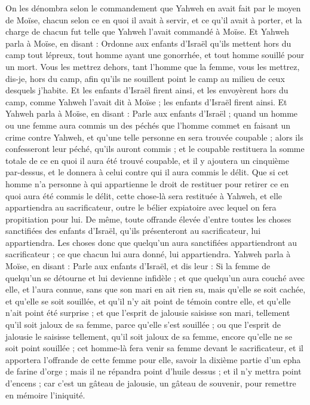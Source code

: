 \begin{multicols}{2}
On les dénombra selon le commandement que Yahweh en avait fait par le moyen de Moïse, chacun selon ce en quoi il avait à servir, et ce qu'il avait à porter, et la charge de chacun fut telle que Yahweh l'avait commandé à Moïse.
\VerseOne{}Et Yahweh parla à Moïse, en disant :
Ordonne aux enfants d'Israël qu'ils mettent hors du camp tout lépreux, tout homme ayant une gonorrhée, et tout homme souillé pour un mort.
Vous les mettrez dehors, tant l'homme que la femme, vous les mettrez, dis-je, hors du camp, afin qu'ils ne souillent point le camp au milieu de ceux desquels j'habite.
Et les enfants d'Israël firent ainsi, et les envoyèrent hors du camp, comme Yahweh l'avait dit à Moïse ; les enfants d'Israël firent ainsi.
Et Yahweh parla à Moïse, en disant :
Parle aux enfants d'Israël ; quand un homme ou une femme aura commis un des péchés que l'homme commet en faisant un crime contre Yahweh, et qu'une telle personne en sera trouvée coupable ;
alors ils confesseront leur péché, qu'ils auront commis ; et le coupable restituera la somme totale de ce en quoi il aura été trouvé coupable, et il y ajoutera un cinquième par-dessus, et le donnera à celui contre qui il aura commis le délit.
Que si cet homme n'a personne à qui appartienne le droit de restituer pour retirer ce en quoi aura été commis le délit, cette chose-là sera restituée à Yahweh, et elle appartiendra au sacrificateur, outre le bélier expiatoire avec lequel on fera propitiation pour lui.
De même, toute offrande élevée d'entre toutes les choses sanctifiées des enfants d'Israël, qu'ils présenteront au sacrificateur, lui appartiendra.
 Les choses donc que quelqu'un aura sanctifiées appartiendront au sacrificateur ; ce que chacun lui aura donné, lui appartiendra.
Yahweh parla à Moïse, en disant :
Parle aux enfants d'Israël, et dis leur : Si la femme de quelqu'un se détourne et lui devienne infidèle ;
et que quelqu'un aura couché avec elle, et l'aura connue, sans que son mari en ait rien su, mais qu'elle se soit cachée, et qu'elle se soit souillée, et qu'il n'y ait point de témoin contre elle, et qu'elle n'ait point été surprise ;
et que l'esprit de jalousie saisisse son mari, tellement qu'il soit jaloux de sa femme, parce qu'elle s'est souillée ; ou que l'esprit de jalousie le saisisse tellement, qu'il soit jaloux de sa femme, encore qu'elle ne se soit point souillée ;
cet homme-là fera venir sa femme devant le sacrificateur, et il apportera l'offrande de cette femme pour elle, savoir la dixième partie d'un epha de farine d'orge ; mais il ne répandra point d'huile dessus ; et il n'y mettra point d'encens ; car c'est un gâteau de jalousie, un gâteau de souvenir, pour remettre en mémoire l'iniquité.

\end{multicols}
